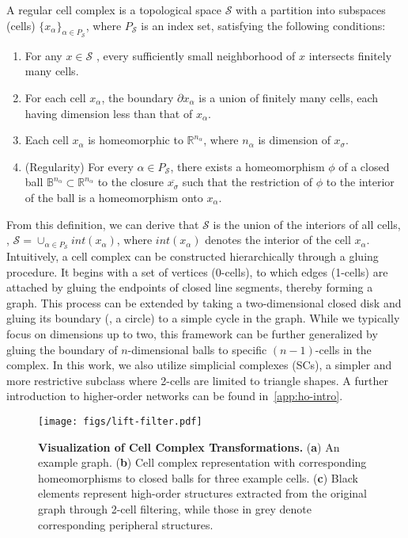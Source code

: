 \begin{definition}
A regular cell complex is a topological space $\mathcal{S}$ with a partition into subspaces (cells) $\{x_\alpha\}_{\alpha\in P_\mathcal{S}}$, where $P_\mathcal{S}$ is an index set, satisfying the following conditions:
\begin{enumerate}[noitemsep,leftmargin=*,topsep=0em]
    \item For any $x \in \mathcal{S}$ , every sufficiently small neighborhood of $x$ intersects finitely many cells.
    \item For each cell $x_\alpha$, the boundary $\partial x_\alpha$ is a union of finitely many cells, each having dimension less than that of $x_\alpha$.
    \item Each cell $x_\alpha$ is homeomorphic to $\mathbb{R}^{n_\alpha}$, where $n_\alpha$ is dimension of $x_\sigma$.
    \item (Regularity) For every $\alpha \in P_\mathcal{S}$, there exists a homeomorphism $\phi$ of a closed ball $\mathbb{B}^{n_\alpha}\subset \mathbb{R}^{n_\alpha}$ to the closure $\overline{x_\sigma}$ such that the restriction of $\phi$ to the interior of the ball is a homeomorphism onto $x_\alpha$.
\end{enumerate}\vspace{-2mm}
\end{definition}
From this definition, we can derive that $\mathcal{S}$ is the union of the interiors of all cells, \ie, $\mathcal{S}= \cup _{\alpha \in P_\mathcal{S}}int(x_\alpha)$, where $int(x_\alpha)$ denotes the interior of the cell $x_\alpha$. 
% 
Intuitively, a cell complex can be constructed hierarchically through a gluing procedure. 
It begins with a set of vertices (0-cells), to which edges (1-cells) are attached by gluing the endpoints of closed line segments, thereby forming a graph.
This process can be extended by taking a two-dimensional closed disk and gluing its boundary (\ie, a circle) to a simple cycle in the graph. 
While we typically focus on dimensions up to two, this framework can be further generalized by gluing the boundary of $n$-dimensional balls to specific $(n-1)$-cells in the complex.
In this work, we also utilize simplicial complexes (SCs), a simpler and more restrictive subclass where 2-cells are limited to triangle shapes.
A further introduction to higher-order networks can be found in~\cref{app:ho-intro}.


\begin{figure}[!t]
\vspace{-0.1in}
\centering
\texttt{[image: figs/lift-filter.pdf]}
\caption{\textbf{Visualization of Cell Complex Transformations.} ({\bf a}) An example graph. ({\bf b}) Cell complex representation with corresponding homeomorphisms to closed balls for three example cells. ({\bf c}) Black elements represent high-order structures extracted from the original graph through 2-cell filtering, while those in grey denote corresponding peripheral structures.}
\label{fig:cell-transform}
\vspace{-4mm}
\end{figure}





